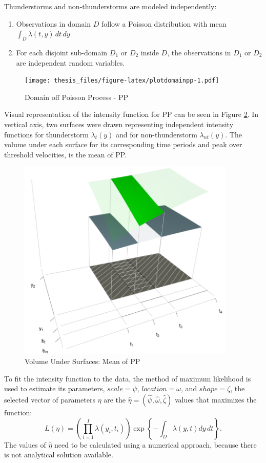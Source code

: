 \documentclass[12pt,oneside]{reedthesis}
\providecommand{\tightlist}{%
  \setlength{\itemsep}{0pt}\setlength{\parskip}{0pt}}
\begin{document}
Thunderstorms and non-thunderstorms are modeled independently:
\begin{enumerate}
\def\labelenumi{\arabic{enumi}.}
\tightlist
\item
  Observations in domain \(D\) follow a Poisson distribution with mean \(\int_D\lambda(t,y)\,dt\,dy\)
\item
  For each disjoint sub-domain \(D_1\) or \(D_2\) inside \(D\), the observations in \(D_1\) or \(D_2\) are independent random variables.
\end{enumerate}
\begin{figure}
\centering
\texttt{[image: thesis\_files/figure-latex/plotdomainpp-1.pdf]}
\caption{\label{fig:plotdomainpp}Domain off Poisson Process - PP}
\end{figure}
Visual representation of the intensity function for PP can be seen in Figure \ref{fig:plotdomain3dpp}. In vertical axis, two surfaces were drawn representing independent intensity functions for thunderstorm \(\lambda_t(y)\) and for non-thunderstorm \(\lambda_{nt}(y)\). The volume under each surface for its corresponding time periods and peak over threshold velocities, is the mean of PP.
\begin{figure}

{\centering \includegraphics[width=4.07in]{figure/domain3d} 

}

\caption{Volume Under Surfaces: Mean of PP}\label{fig:plotdomain3dpp}
\end{figure}
To fit the intensity function to the data, the method of maximum likelihood is used to estimate its parameters, \(scale = \psi\), \(location = \omega\), and \(shape = \zeta\), the selected vector of parameters \(\eta\) are the \(\hat\eta = (\hat\psi, \hat\omega, \hat\zeta)\) values that maximizes the function:
\begin{equation}
          L(\eta)=\left( 
                        \prod_{i=1}^I\lambda\left(y_i,t_i\right)  
                  \right)
                  \exp\left\{
                            -\int_{{D}}\lambda\left(y,t\right)dy\,dt
                     \right\}.
  \label{eq:pplikelihood}
\end{equation}
The values of \(\hat\eta\) need to be calculated using a numerical approach, because there is not analytical solution available.
\end{document}
